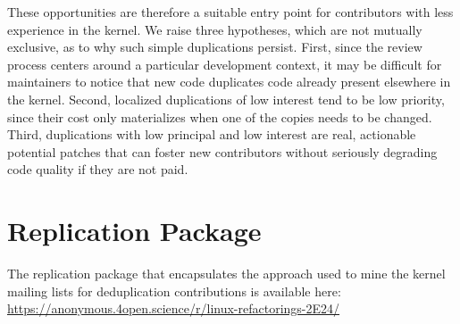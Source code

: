 \documentclass[10pt,conference]{IEEEtran}
\begin{document}
These opportunities are therefore a suitable entry point for contributors with less experience in the kernel.
We raise three hypotheses, which are not mutually exclusive, as to why such simple duplications persist. First, since the review process centers around a particular development context, it may be difficult for maintainers to notice that new code duplicates code already present elsewhere in the kernel. Second, localized duplications of low interest tend to be low priority, since their cost only materializes when one of the copies needs to be changed. Third, duplications with low principal and low interest are real, actionable potential patches that can foster new contributors without seriously degrading code quality if they are not paid.

\section{Replication Package}\label{sec:replication-package}

The replication package that encapsulates the approach used to mine the kernel mailing lists for deduplication contributions is available here: \url{https://anonymous.4open.science/r/linux-refactorings-2E24/}

\newpage


\end{document}

